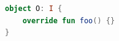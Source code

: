 {{{{{{{{\begin{lstlisting}[language=Kotlin]
object O: I {
    override fun foo() {}
}
\end{lstlisting}




































































































































}}}}}}}}
